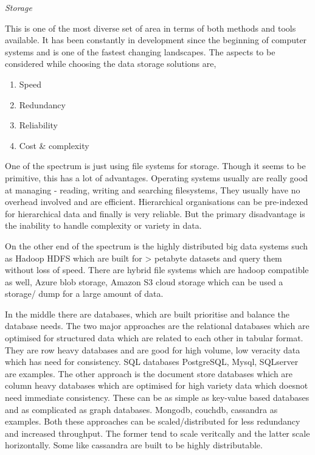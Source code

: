 \textit{Storage}

This is one of the most diverse set of area in terms of both methods and tools available.
It has been constantly in development since the beginning of computer systems and is one of the fastest changing landscapes.
The aspects to be considered while choosing the data storage solutions are,

\begin{enumerate}
    \item Speed
    \item Redundancy
    \item Reliability
    \item Cost \& complexity
\end{enumerate}

One of the spectrum is just using file systems for storage.
Though it seems to be primitive, this has a lot of advantages.
Operating systems usually are really good at managing - reading, writing and searching filesystems, They usually have no overhead involved and are efficient.
Hierarchical organisations can be pre-indexed for hierarchical data and finally is very reliable.
But the primary disadvantage is the inability to handle complexity or variety in data.

On the other end of the spectrum is the highly distributed big data systems such as Hadoop HDFS which are built for > petabyte datasets and query them without loss of speed.
There are hybrid file systems which are hadoop compatible as well, Azure blob storage, Amazon S3 cloud storage which can be used a storage/ dump for a large amount of data.

In the middle there are databases, which are built prioritise and balance the database needs.
The two major approaches are the relational databases which are optimised for structured data which are related to each other in tabular format.
They are row heavy databases and are good for high volume, low veracity data which has need for consistency.
SQL databases PostgreSQL, Mysql, SQLserver are examples.
The other approach is the document store databases which are column heavy databases which are optimised for high variety data which doesnot need immediate consistency.
These can be as simple as key-value based databases and as complicated as graph databases.
Mongodb, couchdb, cassandra as examples.
Both these approaches can be scaled/distributed for less redundancy and increased throughput.
The former tend to scale veritcally and the latter scale horizontally.
Some like cassandra are built to be highly distributable.

